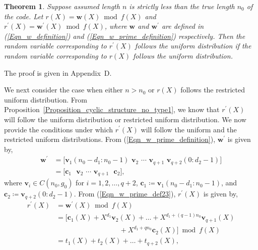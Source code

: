 \documentclass[10pt,journal]{IEEEtran}
\newtheorem{theorem}{Theorem}
\begin{document}
% 
\begin{theorem}
\label{Theorem_W_suff_pre_cyclic_structure}
%  
Suppose assumed length $n$ is strictly less than the true length $n_0$ of the code.
Let $r(X) = \mathbf{w}(X) \bmod f(X)$ and $r^{\prime}(X) = \mathbf{w}^{\prime}(X) \bmod f(X)$,
where $\mathbf{w}$ and $\mathbf{w}^{\prime}$ are defined in (\ref{Eqn_w_definition})
and (\ref{Eqn_w_prime_definition}) respectively.
Then the random variable corresponding to $r^{\prime}(X)$ follows the uniform distribution if
the random variable corresponding to $r(X)$ follows the uniform distribution.
% 
\end{theorem}
% 
\begin{IEEEproof}
%  
The proof is given in Appendix~D. 
% 
\end{IEEEproof}
% 
We next consider the case when either $n > n_0$ or $r(X)$ follows the restricted uniform distribution.
From Proposition~\ref{Proposition_cyclic_structure_no_type1}, we know that $r^{\prime}(X)$ will follow the 
uniform distribution or restricted uniform distribution.
We now provide the conditions under which $r^{\prime}(X)$ will follow the uniform and 
the restricted uniform distributions.
From (\ref{Eqn_w_prime_definition}), $\mathbf{w}^{\prime}$ is given by,
% 
\begin{equation}
% 
\begin{aligned}
%  
\mathbf{w}^{\prime} &=\Big[ \mathbf{v}_{1}(n_0-d_1:n_0-1)  \mbox{~} \mathbf{v}_{2} \mbox{~} \cdots \mbox{~} \mathbf{v}_{q+1}  \mbox{~} \mathbf{v}_{q+2}(0:d_2-1) \Big] \\ 
		    & = \Big[ \mathbf{c}_{1}  \mbox{~~} \mathbf{v}_{2} \mbox{~} \cdots \mbox{~} \mathbf{v}_{q+1}  \mbox{~~}  \mathbf{c}_{2} \Big], 
\label{Eqn_w_prime_def23}
% 
\end{aligned}
% 
\end{equation}
% 
where $\mathbf{v}_i \in C(n_0,g_0)$ for $i = 1,2,\ldots, q+2$, 
$\mathbf{c}_{1} \coloneqq \mathbf{v}_{1}(n_0-d_1:n_0-1)$, and $\mathbf{c}_{2} \coloneqq \mathbf{v}_{q+2}(0:d_2-1)$.
% 
From (\ref{Eqn_w_prime_def23}), $r^{\prime}(X)$ is given by,
% 
\begin{equation}
% 
\begin{aligned}
%  
r^{\prime}(X) &= \mathbf{w}^{\prime}(X) \bmod f(X) \\
	      &= \Big[ \mathbf{c}_1(X) + X^{d_1} \mathbf{v}_2(X) + \ldots + X^{d_1+(q-1)n_0}\mathbf{v}_{q+1}(X) \\
	      & \mbox{~~~~~~~~~~~~~~~~~~~~~~~~~~~}+ X^{d_1+qn_0}\mathbf{c}_{2}(X) \Big] \bmod f(X) \\
	      &= t_1(X) + t_2(X) + \ldots + t_{q+2}(X), 
% 
\end{aligned}
% 
\label{Eqn_t1_t2_tq2}
% 
\end{equation}
\end{document}
